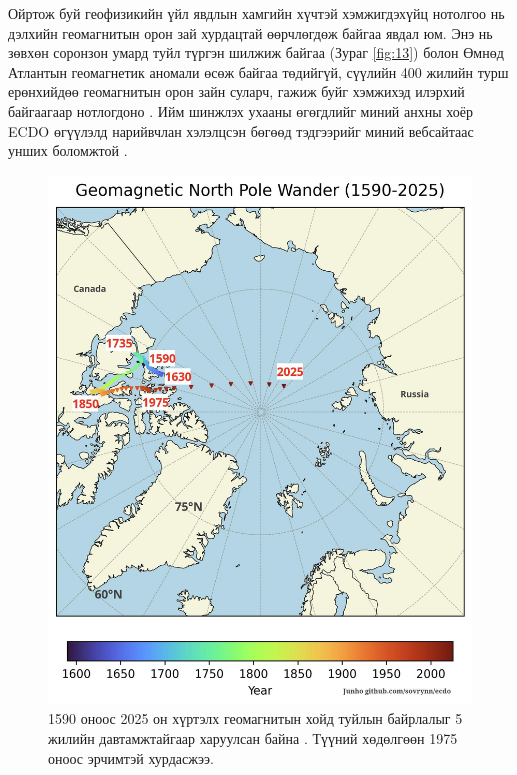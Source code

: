 \documentclass[10pt,twocolumn,letterpaper]{article}
\begin{document}
{Ойртож буй геофизикийн үйл явдлын хамгийн хүчтэй хэмжигдэхүйц нотолгоо нь дэлхийн геомагнитын орон зай хурдацтай өөрчлөгдөж байгаа явдал юм. Энэ нь зөвхөн соронзон умард туйл түргэн шилжиж байгаа (Зураг \ref{fig:13}) болон Өмнөд Атлантын геомагнетик аномали өсөж байгаа төдийгүй, сүүлийн 400 жилийн турш ерөнхийдөө геомагнитын орон зайн суларч, гажиж буйг хэмжихэд илэрхий байгаагаар нотлогдоно \cite{3}. Ийм шинжлэх ухааны өгөгдлийг миний анхны хоёр ECDO өгүүлэлд нарийвчлан хэлэлцсэн бөгөөд тэдгээрийг миний вебсайтаас унших боломжтой \cite{3}.

\begin{figure}[t]
\begin{center}
   \includegraphics[width=1\linewidth]{npw.jpg}
\end{center}
   \caption{1590 оноос 2025 он хүртэлх геомагнитын хойд туйлын байрлалыг 5 жилийн давтамжтайгаар харуулсан байна \cite{41}. Түүний хөдөлгөөн 1975 оноос эрчимтэй хурдасжээ.}
\label{fig:13}
\label{fig:onecol}
\end{figure}

}
\end{document}
